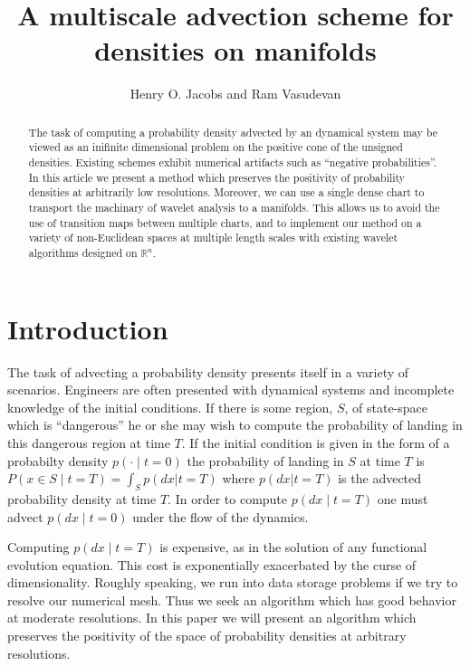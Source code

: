\documentclass[letterpaper, 12 pt]{amsart}
\title{
  A 
  multiscale
  advection scheme for
  densities on manifolds
}
\author{Henry O. Jacobs and Ram Vasudevan}%
\newcommand{\R}{\mathbb{R}}
\begin{document}
\maketitle

\begin{abstract}
  The task of computing a probability density advected by an 
  dynamical system may be viewed as an inifinite dimensional problem
  on the positive cone of the unsigned densities.
  Existing schemes exhibit numerical artifacts such as
  ``negative probabilities''.
  In this article we present a method
  which preserves the positivity of probability densities
  at arbitrarily low resolutions.
  Moreover, we can use a single dense chart to transport the machinary of wavelet analysis to a manifolds.
  This allows us to avoid the use of transition maps between multiple charts, and to implement our method on a variety of non-Euclidean spaces at multiple length scales with existing wavelet algorithms designed on $\R^n$.
\end{abstract}


\section{Introduction}
  The task of advecting a probability density presents itself
  in a variety of scenarios.
  Engineers are often presented
  with dynamical systems and incomplete knowledge
  of the initial conditions.
  If there is some region, $S$, of state-space which is ``dangerous''
  he or she may wish to compute the probability of landing
  in this dangerous region at time $T$.
  If the initial condition is given in the form of a
  probabilty density $p(\cdot \mid t=0)$
  the probability of landing in $S$ at time $T$
  is $P( x \in S \mid t = T)  = \int_S p( dx | t=T )$
  where $p(dx|t=T)$ is the advected probability density at time $T$.
  In order to compute $p(dx\mid t=T)$
  one must advect $p(dx\mid t=0)$ under the flow of the dynamics.
  
  Computing $p(dx \mid t=T)$ is expensive, as in the solution of any
  functional evolution equation.
  This cost is exponentially exacerbated by the curse of dimensionality.
  Roughly speaking, we run into data storage problems if we try to resolve
  our numerical mesh.
  Thus we seek an algorithm which has good behavior at moderate resolutions.
  In this paper we will present an algorithm which preserves the positivity
  of the space of probability densities at arbitrary resolutions.
\end{document}

